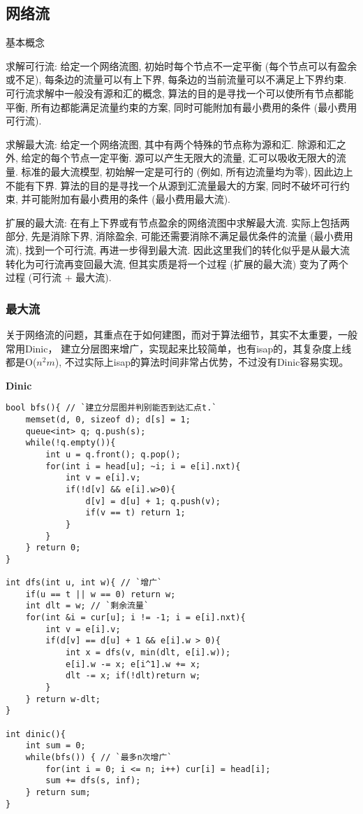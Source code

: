 \subsection{网络流}


基本概念 

求解可行流: 给定一个网络流图, 初始时每个节点不一定平衡 (每个节点可以有盈余或不足), 每条边的流量可以有上下界, 每条边的当前流量可以不满足上下界约束. 可行流求解中一般没有源和汇的概念, 算法的目的是寻找一个可以使所有节点都能平衡, 所有边都能满足流量约束的方案, 同时可能附加有最小费用的条件 (最小费用可行流). 

求解最大流: 给定一个网络流图, 其中有两个特殊的节点称为源和汇. 除源和汇之外, 给定的每个节点一定平衡. 源可以产生无限大的流量, 汇可以吸收无限大的流量. 标准的最大流模型, 初始解一定是可行的 (例如, 所有边流量均为零), 因此边上不能有下界. 算法的目的是寻找一个从源到汇流量最大的方案, 同时不破坏可行约束, 并可能附加有最小费用的条件 (最小费用最大流). 

扩展的最大流: 在有上下界或有节点盈余的网络流图中求解最大流. 实际上包括两部分, 先是消除下界, 消除盈余, 可能还需要消除不满足最优条件的流量 (最小费用流), 找到一个可行流, 再进一步得到最大流. 因此这里我们的转化似乎是从最大流转化为可行流再变回最大流, 但其实质是将一个过程 (扩展的最大流) 变为了两个过程 (可行流 + 最大流). 

\subsubsection{最大流}

关于网络流的问题，其重点在于如何建图，而对于算法细节，其实不太重要，一般常用Dinic， 建立分层图来增广，实现起来比较简单，也有isap的，其复杂度上线都是O($n^2m$),  不过实际上isap的算法时间非常占优势，不过没有Dinic容易实现。

{\bfseries Dinic}

\begin{lstlisting}
bool bfs(){ // `建立分层图并判别能否到达汇点t.`
    memset(d, 0, sizeof d); d[s] = 1;
    queue<int> q; q.push(s);
    while(!q.empty()){
        int u = q.front(); q.pop();
        for(int i = head[u]; ~i; i = e[i].nxt){
            int v = e[i].v;
            if(!d[v] && e[i].w>0){
                d[v] = d[u] + 1; q.push(v);
                if(v == t) return 1;
            }
        }
    } return 0;
}

int dfs(int u, int w){ // `增广`
    if(u == t || w == 0) return w;
    int dlt = w; // `剩余流量`
    for(int &i = cur[u]; i != -1; i = e[i].nxt){
        int v = e[i].v;
        if(d[v] == d[u] + 1 && e[i].w > 0){
            int x = dfs(v, min(dlt, e[i].w));
            e[i].w -= x; e[i^1].w += x;
            dlt -= x; if(!dlt)return w;
        }
    } return w-dlt;
}

int dinic(){
    int sum = 0;
    while(bfs()) { // `最多n次增广`
        for(int i = 0; i <= n; i++) cur[i] = head[i];
        sum += dfs(s, inf);
    } return sum;
}
\end{lstlisting}


